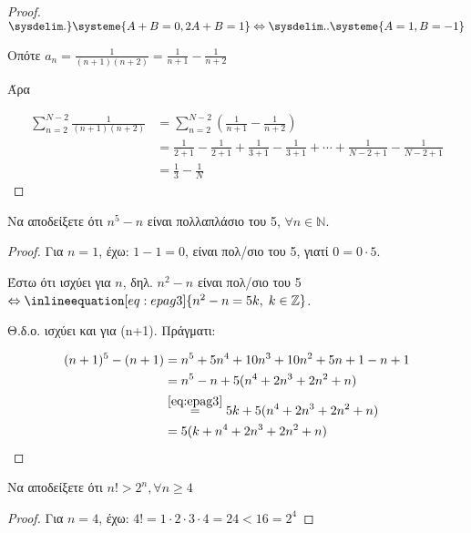 \begin{multicols}{2}
\begin{enumerate}
\begin{proof}
    $  \sysdelim.\}\systeme{A+B=0,2A+B=1} \Leftrightarrow \sysdelim..
    \systeme{A=1,B=-1} $

    Οπότε $ a_{n} = \frac{1}{(n+1)(n+2)} = \frac{1}{n+1} - \frac{1}{n+2} $
    
    Άρα 
    
    \begin{align*}
        \sum_{n=2}^{N-2} \frac{1}{(n+1)(n+2)} 
        &= \sum_{n=2}^{N-2} (\frac{1}{n+1} - \frac{1}{n+2})   \\
        &= \frac{1}{2+1} - \frac{1}{2+1} + \frac{1}{3+1} - \frac{1}{3+1} +\cdots +
        \frac{1}{N-2+1} - \frac{1}{N-2+1} \\
        &= \frac{1}{3} - \frac{1}{N} 
    \end{align*}
        \end{proof}

    \item Να αποδείξετε ότι $ n^{5} - n $ είναι πολλαπλάσιο του 5,
        $ \forall n \in \mathbb{N} $.

        \begin{proof}
            Για $ n=1 $, έχω: $ 1-1=0 $, είναι πολ/σιο του 5, γιατί $0=0\cdot 5$.

            Έστω ότι ισχύει για $n$, δηλ. $n^{2}-n $ 
                είναι πολ/σιο του 5 $
                \Leftrightarrow \inlineequation[eq:epag3]{n^{2}-n=5k, 
                \; k \in \mathbb{Z}} $.

            Θ.δ.ο. ισχύει και για (n+1). Πράγματι:

            \begin{align*}
                (n+1)^{5}-(n+1) &= n^{5}+5n^{4}+10n^{3}+10n^{2}+5n+1-n+1 \\
                                &=n^{5}-n+5(n^{4}+2n^{3}+2n^{2}+n) \\
                                &\overset{\eqref{eq:epag3}}{=} 5k 
                                + 5(n^{4}+2n^{3}+2n^{2}+n) \\ 
                                &= 5(k + n^{4}+2n^{3}+2n^{2}+n)
            \end{align*}
        \end{proof}


    \item Να αποδείξετε ότι $ n! > 2^{n}, \forall n \geq 4 $

        \begin{proof}
        \item {}
            Για $ n=4 $, έχω: $ 4! = 1\cdot 2 \cdot 3 \cdot 4 = 24 < 16 = 2^{4} $


\end{proof}
\end{enumerate}
\end{multicols}
